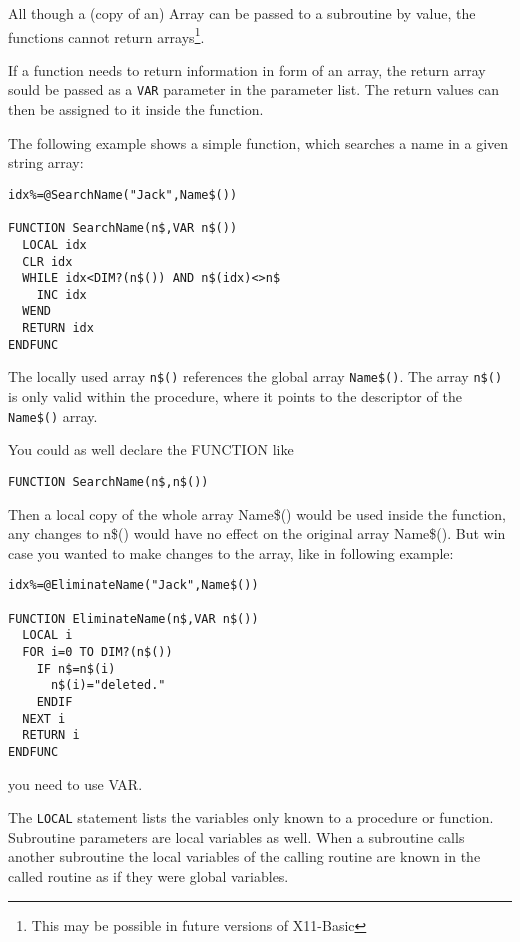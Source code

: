 All though a (copy of an) Array can be passed to a subroutine by value, the
functions cannot return arrays\footnote{This may be possible in future versions
of X11-Basic}.

If a function needs to return information in form of an array, the return array 
sould be passed as a \verb|VAR| parameter in the parameter list. The return 
values can then be assigned to it inside the function. 

The following example shows a simple
function, which searches a name in a given string array:
\begin{mdframed}[hidealllines=true,backgroundcolor=blue!20]
\begin{verbatim}
idx%=@SearchName("Jack",Name$())

FUNCTION SearchName(n$,VAR n$())
  LOCAL idx
  CLR idx
  WHILE idx<DIM?(n$()) AND n$(idx)<>n$
    INC idx
  WEND
  RETURN idx
ENDFUNC
\end{verbatim}
\end{mdframed}

The locally used array \verb|n$()| references the global array \verb|Name$()|.
The array \verb|n$()| is only valid within the procedure, where it points to
the descriptor of the \verb|Name$()| array. 

You could as well declare the FUNCTION like 
\begin{mdframed}[hidealllines=true,backgroundcolor=blue!20]
\begin{verbatim}
FUNCTION SearchName(n$,n$())
\end{verbatim}
\end{mdframed}

Then a local copy of the whole array Name\$() would be used inside 
the function, any changes to n\$() would have no effect on the original array 
Name\$(). But win case you wanted to make changes to the array, like in following example:
 
\begin{mdframed}[hidealllines=true,backgroundcolor=blue!20]
\begin{verbatim}
idx%=@EliminateName("Jack",Name$())

FUNCTION EliminateName(n$,VAR n$())
  LOCAL i
  FOR i=0 TO DIM?(n$())
    IF n$=n$(i)
      n$(i)="deleted."
    ENDIF
  NEXT i
  RETURN i
ENDFUNC
\end{verbatim}
\end{mdframed}
you need to use VAR.

The \verb|LOCAL| statement lists the variables only known to a procedure or
function. Subroutine parameters are local variables as well.  When a
subroutine calls another subroutine the local variables of the calling routine
are known in the called routine as if they were global variables. 

